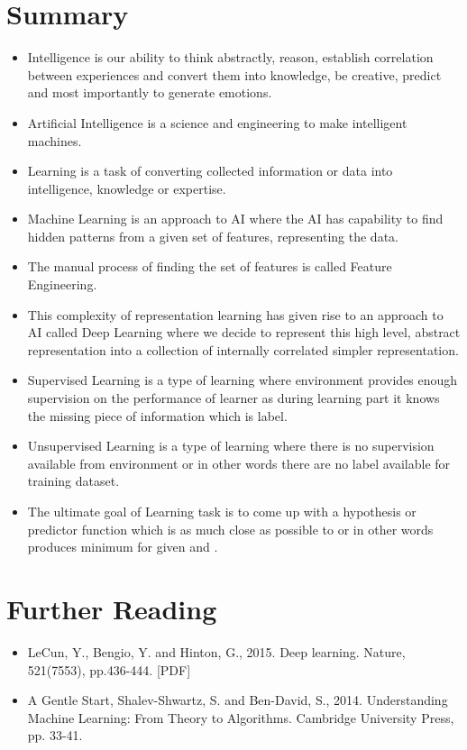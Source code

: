\documentclass[a4paper]{article}
\begin{document}
\section{Summary}
\begin{itemize}
\item Intelligence is our ability to think abstractly, reason, establish correlation between experiences and convert them into knowledge, be creative, predict and most importantly to generate emotions.
\item Artificial Intelligence is a science and engineering to make intelligent machines.
\item Learning is a task of converting collected information or data into intelligence, knowledge or expertise.
\item Machine Learning is an approach to AI where the AI has capability to find hidden patterns from a given set of features, representing the data.
\item The manual process of finding the set of features is called Feature Engineering.
\item This complexity of representation learning has given rise to an approach to AI called Deep Learning where we decide to represent this high level, abstract representation into a collection of internally correlated simpler representation.
\item Supervised Learning is a type of learning where environment provides enough supervision on the performance of learner as during learning part it knows the missing piece of information which is label.
\item Unsupervised Learning is a type of learning where there is no supervision available from environment or in other words there are no label available for training dataset.
\item The ultimate goal of Learning task is to come up with a hypothesis or predictor function  which is as much close as possible to  or in other words produces minimum  for given  and . 
\end{itemize}



\section{Further Reading}
\begin{itemize}
\item LeCun, Y., Bengio, Y. and Hinton, G., 2015. Deep learning. Nature, 521(7553), pp.436-444. [PDF]
\item A Gentle Start, Shalev-Shwartz, S. and Ben-David, S., 2014. Understanding Machine Learning: From Theory to Algorithms. Cambridge University Press, pp. 33-41.
\end{itemize}
\end{document}
